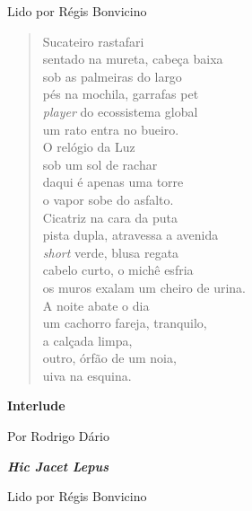 Lido por Régis Bonvicino

\begin{verse}
Sucateiro rastafari\\
sentado na mureta, cabeça baixa\\
sob as palmeiras do largo\\
pés na mochila, garrafas pet\\[5pt]
\emph{player} do ecossistema global\\
um rato entra no bueiro.\\
O relógio da Luz\\
sob um sol de rachar\\[5pt]
daqui é apenas uma torre\\
o vapor sobe do asfalto.\\
Cicatriz na cara da puta\\
pista dupla, atravessa a avenida\\[5pt]
\emph{short} verde, blusa regata\\
cabelo curto, o michê esfria\\
os muros exalam um cheiro de urina.\\
A noite abate o dia\\[5pt]
um cachorro fareja, tranquilo,\\
a calçada limpa,\\
outro, órfão de um noia,\\
uiva na esquina.
\end{verse}

\pagebreak

\textbf{Interlude}

Por Rodrigo Dário

\pagebreak

\textbf{\emph{Hic Jacet Lepus}}

Lido por Régis Bonvicino

